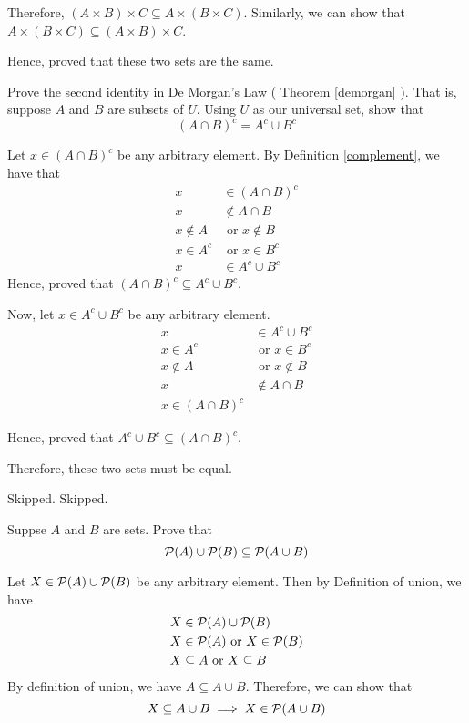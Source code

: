 Therefore, $(A \times B) \times C \subseteq A \times (B \times C)$.
Similarly, we can show that $A \times (B \times C) \subseteq (A \times B) \times C$.

Hence, proved that these two sets are the same.
\es


\bp
Prove the second identity in De Morgan's Law ( Theorem \ref{demorgan} ).
That is, suppose $A$ and $B$ are subsets of $U$. Using $U$ as our universal set, show that
$$(A \cap B)^c  = A^c \cup B^c$$
\ep

\bs
Let $x \in (A \cap B)^c$ be any arbitrary element. By Definition \ref{complement}, we have that
\begin{align}
	x           & \in (A \cap B)^c        \\
	x           & \not\in A \cap B        \\
	x \not\in A & \text{ or } x \not\in B \\
	x \in A^c   & \text{ or } x \in B^c   \\
	x           & \in A^c \cup B^c
\end{align}
Hence, proved that $(A \cap B)^c \subseteq A^c \cup B^c$.

Now, let $x \in A^c \cup B^c$ be any arbitrary element.
\begin{align}
	x           & \in A^c \cup B^c        \\
	x \in A^c   & \text{ or } x \in B^c   \\
	x \not\in A & \text{ or } x \not\in B \\
	x           & \not\in A \cap B        \\
	x \in (A \cap B)^c
\end{align}

Hence, proved that $A^c \cup B^c \subseteq (A \cap B)^c$.

Therefore, these two sets must be equal.
\es


\bp Skipped.\ep
\bp Skipped.\ep

\bp  Suppse $A$ and $B$ are sets. Prove that
$$\mathcal{P}(A) \cup \mathcal{P}(B) \subseteq \mathcal{P}(A \cup B)$$
\ep

\bs
Let $X \in \mathcal{P}(A) \cup \mathcal{P}(B)$ be any arbitrary element. Then by Definition of union, we have
\begin{align}
	X & \in \mathcal{P}(A) \cup \mathcal{P}(B)              \\
	X & \in \mathcal{P}(A) \text{ or } X \in \mathcal{P}(B) \\
	X & \subseteq A \text{ or } X \subseteq B
\end{align}
By definition of union, we have $A \subseteq A \cup B$. Therefore, we can show that
$$X \subseteq A \cup B \implies X \in \mathcal{P}(A \cup B)$$


